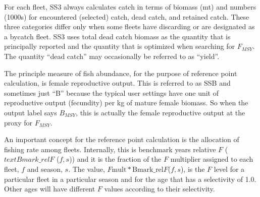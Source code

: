 For each fleet, SS3 always calculates catch in terms of biomass (mt) and numbers (1000s) for encountered (selected) catch, dead catch, and retained catch. These three categories differ only when some fleets have discarding or are designated as a bycatch fleet. SS3 uses total dead catch biomass as the quantity that is principally reported and the quantity that is optimized when searching for $F_{MSY}$. The quantity ``dead catch'' may occasionally be referred to as ``yield''.

The principle measure of fish abundance, for the purpose of reference point calculation, is female reproductive output. This is referred to as SSB and sometimes just ``B'' because the typical user settings have one unit of reproductive output (fecundity) per kg of mature female biomass. So when the output label says $B_{MSY}$, this is actually the female reproductive output at the proxy for $F_{MSY}$.

An important concept for the reference point calculation is the allocation of fishing rate among fleets. Internally, this is benchmark years relative $F$ ($text{Bmark\_rel}F$ ($f,s$)) and it is the fraction of the $F$ multiplier assigned to each fleet, $f$ and season, $s$. The value, $F\text{mult} * \text{Bmark\_rel}F$($f,s$), is the $F$ level for a particular fleet in a particular season and for the age that has a selectivity of 1.0. Other ages will have different $F$ values according to their selectivity.

